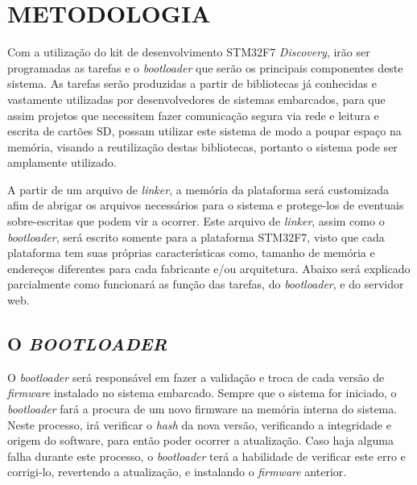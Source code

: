 
\chapter{METODOLOGIA}
\label{chap:metodologia}
Com a utilização do kit de desenvolvimento STM32F7 \textit{Discovery}, irão ser programadas as tarefas e o \textit{bootloader} que serão os principais componentes deste sistema. As tarefas serão produzidas a partir de bibliotecas já conhecidas e vastamente utilizadas por desenvolvedores de sistemas embarcados, para que assim projetos que necessitem fazer comunicação segura via rede e leitura e escrita de cartões SD, possam utilizar este sistema de modo a poupar espaço na memória, visando a reutilização destas bibliotecas, portanto o sistema pode ser amplamente utilizado.


A partir de um arquivo de \textit{linker}, a memória da plataforma será customizada afim de abrigar os arquivos necessários para o sistema e protege-los de eventuais sobre-escritas que podem vir a ocorrer. Este arquivo de \textit{linker}, assim como o \textit{bootloader}, será escrito somente para a plataforma STM32F7, visto que cada plataforma tem suas próprias características como, tamanho de memória e endereços diferentes para cada fabricante e/ou arquitetura. Abaixo será explicado parcialmente como funcionará as função das tarefas, do \textit{bootloader}, e do servidor web.

\section{O \textit{BOOTLOADER}}
\label{sec:Bootloader}

O \textit{bootloader} será responsável em fazer a validação e troca de cada versão de \textit{firmware} instalado no sistema embarcado. Sempre que o sistema for iniciado, o \textit{bootloader} fará a procura de um novo firmware na memória interna do sistema. Neste processo, irá verificar o \textit{hash} da nova versão, verificando a integridade e origem do software, para então poder ocorrer a atualização. Caso haja alguma falha durante este processo, o \textit{bootloader} terá a habilidade de verificar este erro e corrigi-lo, revertendo a atualização, e instalando o \textit{firmware} anterior.

